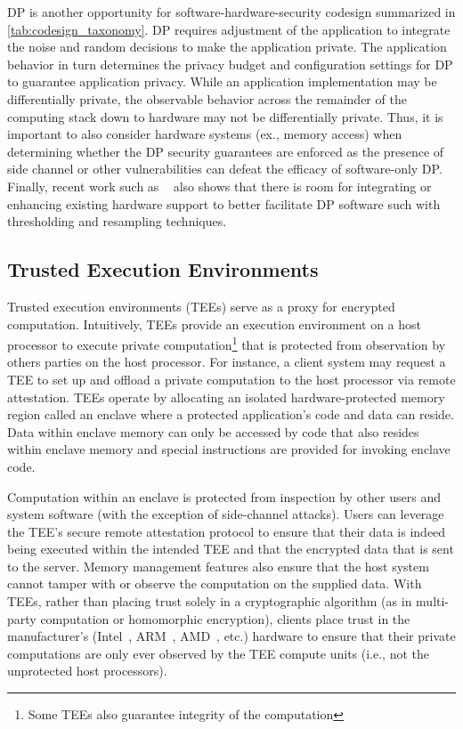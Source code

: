 DP is another opportunity for software-hardware-security codesign summarized in \autoref{tab:codesign_taxonomy}.
DP requires adjustment of the application to integrate the noise and random decisions to make the application private.
The application behavior in turn determines the privacy budget and configuration settings for DP to guarantee application privacy.
While an application implementation may be differentially private, the observable behavior across the remainder of the computing stack down to hardware may not be differentially private.
Thus, it is important to also consider hardware systems (ex., memory access) when determining whether the DP security guarantees are enforced as the presence of side channel or other vulnerabilities can defeat the efficacy of software-only DP.
Finally, recent work such as ~\cite{choi2018guaranteeing, maycock2015hardware} also shows that there is room for integrating or enhancing existing hardware support to better facilitate DP software such with thresholding and resampling techniques.

\subsection{Trusted Execution Environments}

Trusted execution environments (TEEs) serve as a proxy for encrypted computation.
Intuitively, TEEs provide an execution environment on a host processor to execute private computation\footnote{Some TEEs also guarantee integrity of the computation} that is protected from observation by others parties on the host processor.
For instance, a client system may request a TEE to set up and offload a private computation to the host processor via remote attestation.
TEEs operate by allocating an isolated hardware-protected memory region called an enclave where a protected application's code and data can reside.
Data within enclave memory can only be accessed by code that also resides within enclave memory and special instructions are provided for invoking enclave code.

Computation within an enclave is protected from inspection by other users and system software (with the exception of side-channel attacks).
Users can leverage the TEE's secure remote attestation protocol to ensure that their data is indeed being executed within the intended TEE and that the encrypted data that is sent to the server.
Memory management features also ensure that the host system cannot tamper with or observe the computation on the supplied data.
With TEEs, rather than placing trust solely in a cryptographic algorithm (as in multi-party computation or homomorphic encryption), clients place trust in the manufacturer's (Intel~\cite{mckeen2013innovative}, ARM~\cite{alves2004trustzone}, AMD~\cite{kaplan2016amd}, etc.) hardware to ensure that their private computations are only ever observed by the TEE compute units (i.e., not the unprotected host processors).

